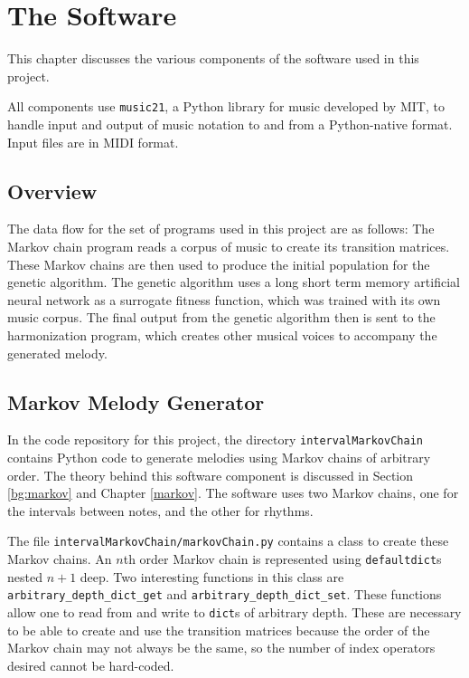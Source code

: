 \chapter{The Software} \label{software}


This chapter discusses the various components of the software used in this project.

All components use \texttt{music21}, a Python library for music developed by MIT, to handle input and output of music notation to and from a Python-native format.
Input files are in MIDI format.

\section{Overview}

The data flow for the set of programs used in this project are as follows:
The Markov chain program reads a corpus of music to create its transition matrices.
These Markov chains are then used to produce the initial population for the genetic algorithm.
The genetic algorithm uses a long short term memory artificial neural network as a surrogate fitness function, which was trained with its own music corpus.
The final output from the genetic algorithm then is sent to the harmonization program, which creates other musical voices to accompany the generated melody.


\section{Markov Melody Generator}

In the code repository for this project, the directory \texttt{intervalMarkovChain} contains Python code to generate melodies using Markov chains of arbitrary order.
The theory behind this software component is discussed in Section \ref{bg:markov} and Chapter \ref{markov}.
The software uses two Markov chains, one for the intervals between notes, and the other for rhythms.

The file \texttt{intervalMarkovChain/markovChain.py} contains a class to create these Markov chains.
An $n$th order Markov chain is represented using \texttt{defaultdict}s nested $n + 1$ deep.
Two interesting functions in this class are \texttt{arbitrary\_depth\_dict\_get} and \texttt{arbitrary\_depth\_dict\_set}.
These functions allow one to read from and write to \texttt{dict}s of arbitrary depth.
These are necessary to be able to create and use the transition matrices because the order of the Markov chain may not always be the same, so the number of index operators desired cannot be hard-coded.

